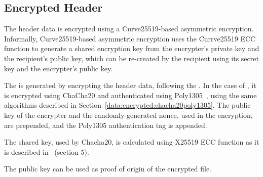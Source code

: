 \subsection{Encrypted Header}\label{header:encrypted}

The header data is encrypted using a Curve25519-based asymmetric encryption.
%
Informally, Curve25519-based asymmetric encryption uses the Currve25519 ECC function to generate a shared encryption key from the encrypter's private key and the recipient's public key, which can be re-created by the recipient using its secret key and the encrypter's public key.
%

The  is generated by encrypting the header data, following the .
%
In the case of , it is encrypted using ChaCha20 and authenticated using Poly1305~\cite{RFC8439}, using the same algorithms described in Section~\ref{data:encrypted:chacha20poly1305}.
%
The public key of the encrypter and the randomly-generated nonce, used in the encryption, are prepended, and the Poly1305 authentication tag is appended.


The shared key, used by Chacha20, is calculated using X25519 ECC function as it is described in~\cite{RFC7748} (section 5).
%

The public key can be used as proof of origin of the encrypted file.
%
